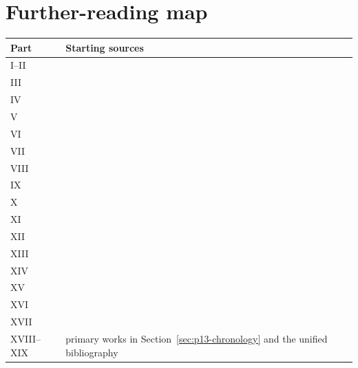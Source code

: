 \section*{Further-reading map}
\label{sec:p14-further-reading}

\begin{tabularx}{\textwidth}{@{}l X@{}}
\toprule
Part & Starting sources \\
\midrule
I--II & \cite{Enderton2001,ChiswellHodges2007,OpenLogic2026} \\
III & \cite{Hodges1993,Marker2002,Marker2024} \\
IV & \cite{BoolosBurgessJeffrey2007,Shoenfield1967,AroraBarak2009} \\
V & \cite{Kaye1991,Boolos1993,Simpson2009} \\
VI & \cite{Jech2003,Kunen2011,Kanamori2003} \\
VII & \cite{TroelstraSchwichtenberg2000,Prawitz1965,GirardLafontTaylor1989} \\
VIII & \cite{BlackburnDeRijkeVenema2001,ChagrovZakharyaschev1997,Hajek1998} \\
IX & \cite{Libkin2004,BaaderHorrocksLutzSattler2017,ClarkeGrumbergPeled1999} \\
X & \cite{BurrisSankappanavar1981,Johnstone1982,MacLaneMoerdijk1992} \\
XI & \cite{GrinsteadSnellChance2006,Feller1968ProbabilityI,Feller1971ProbabilityII} \\
XII & \cite{Pearl2009CausalOverview,ShpitserPearl2006JointIdentification} \\
XIII & \cite{Rubinstein2015LectureNotes} \\
XIV & \cite{Dung1995,Walton2016ArgumentEvaluation} \\
XV & \cite{JohnsonLaird2021MentalModels,ThompsonElqayamAckerman2021MetaReasoning} \\
XVI & \cite{Halbach2011,Keefe2000,BeallRestall2006} \\
XVII & \cite{RobinsonVoronkov2001,SMTLIB2025,LeanManual2026} \\
XVIII--XIX & primary works in Section~\ref{sec:p13-chronology} and the unified bibliography \\
\bottomrule
\end{tabularx}
